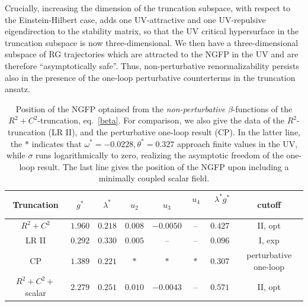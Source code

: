 \documentclass[preprint,preprintnumbers,amsmath,amssymb,nofootinbib,APS]{revtex4}
\newcommand{\2}{\sqrt{2\,}}
\begin{document}
Crucially, increasing the dimension of the truncation subspace, with respect to the Einstein-Hilbert case, adds one UV-attractive and one UV-repulsive eigendirection to the stability matrix, so that the UV critical hypersurface in the truncation subspace is now three-dimensional. We then have a three-dimensional subspace of RG trajectories which are attracted to the NGFP in the UV and are therefore ``asymptotically safe''.  Thus, non-perturbative renormalizability persists also in the presence of the 
one-loop perturbative counterterms in the truncation ansatz.

\begin{table}[t!]
\begin{center}
\begin{tabular}{|c||c|c|c|c|c||c|c|}\hline
Truncation & \; \, $g^*$ \; \, & \; \, $\lambda^*$ \; \, & \; \, $u_2$ \, \; & \; \, $u_3$ \, \; & \; \,$u_4$ \, \;& \; \, $\lambda^* g^*$ \, \; & cutoff \\ \hline
$R^2 + C^2$ & $1.960$ & $0.218$ & $0.008$ & $-0.0050$ & -- &   $0.427$ & II, opt \\
%
LR II  & $0.292$ & $0.330$ & $0.005$ & -- & -- &  $0.096$ & I, exp \\
CP &  $1.389$  &  $ 0.221 $  & $*$ & $*$ & $*$ & $ 0.307$   & \; perturbative one-loop  \; \\ \hline \hline
\; $R^2 + C^2 + $ scalar \; & 
$2.279$ & $0.251$ & $0.010$ & $-0.0043$ & -- &   $0.571$ & II, opt \\ \hline
\end{tabular}
\parbox[c]{\textwidth}{\caption{\label{t.FP}{Position of the NGFP optained from the {\it non-perturbative} $\beta$-functions of the $R^2 + C^2$-truncation, eq.\ \eqref{beta}. For comparison, we also give the data of the $R^2$-truncation \cite{Lauscher:2002mb} (LR II), and the perturbative one-loop result \cite{Codello:2006in} (CP). In the latter line, the $*$ indicates that $\omega^* =-0.0228, \theta^* = 0.327$ approach finite values in the UV, while $\sigma$ runs logarithmically to zero, realizing the asymptotic freedom of the one-loop result. The last line gives the position of the NGFP upon including a minimally coupled scalar field.}}}
\end{center}
\end{table}
\end{document}
